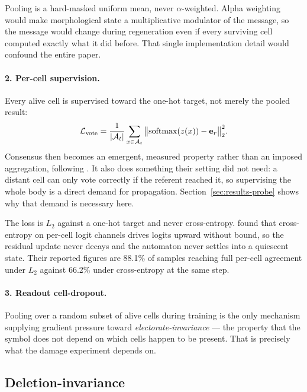 Pooling is a hard-masked uniform mean, never $\alpha$-weighted. Alpha weighting
would make morphological state a multiplicative modulator of the message, so the
message would change during regeneration even if every surviving cell computed
exactly what it did before. That single implementation detail would confound the
entire paper.

\paragraph{2. Per-cell supervision.} Every alive cell is supervised toward the
one-hot target, not merely the pooled result:
%
\begin{equation}
  \mathcal{L}_{\mathrm{vote}} = \frac{1}{|\mathcal{A}_t|} \sum_{x \in \mathcal{A}_t}
    \big\| \mathrm{softmax}(z(x)) - \mathbf{e}_{r} \big\|_2^2 .
\end{equation}
%
Consensus then becomes an emergent, measured property rather than an imposed
aggregation, following \citet{randazzo2020selfclassifying}. It also does
something their setting did not need: a distant cell can only vote correctly if
the referent reached it, so supervising the whole body is a direct demand for
propagation. Section~\ref{sec:results-probe} shows why that demand is necessary
here.

The loss is $L_2$ against a one-hot target and never cross-entropy.
\citet{randazzo2020selfclassifying} found that cross-entropy on per-cell logit
channels drives logits upward without bound, so the residual update never decays
and the automaton never settles into a quiescent state. Their reported figures
are 88.1\% of samples reaching full per-cell agreement under $L_2$ against 66.2\%
under cross-entropy at the same step.

\paragraph{3. Readout cell-dropout.} Pooling over a random subset of alive cells
during training is the only mechanism supplying gradient pressure toward
\emph{electorate-invariance} --- the property that the symbol does not depend on
which cells happen to be present. That is precisely what the damage experiment
depends on. 

\subsection{Deletion-invariance}

